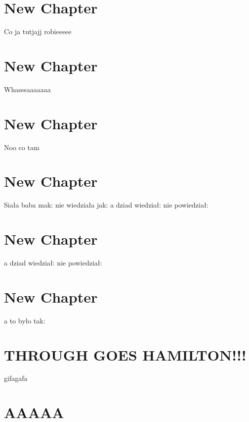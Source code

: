 \documentclass{article}
\begin{document}
\section{New Chapter}
Co ja tutjajj robieeeee
\section{New Chapter}
Whasssaaaaaaa
\section{New Chapter}
Noo co tam
\section{New Chapter}
Siała baba mak: nie wiedziała jak: a dziad wiedział: nie powiedział:
\section{New Chapter}
a dziad wiedział: nie powiedział:
\section{New Chapter}
a to było tak:
\section{THROUGH GOES HAMILTON!!!}
gifagafa
\section{AAAAA}
\end{document}
